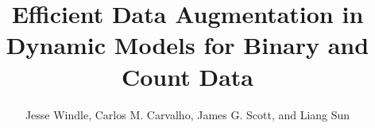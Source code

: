\documentclass[12pt]{article}
\begin{document}
\renewcommand{\thefootnote}{\fnsymbol{footnote}}
\author{
  Jesse Windle\footnotemark[1],
  Carlos M. Carvalho\footnotemark[2],
  James G. Scott\footnotemark[2], and
  Liang Sun\footnotemark[2]%
}

\title{Efficient Data Augmentation in Dynamic Models for Binary and Count Data}

\maketitle

\renewcommand{\thefootnote}{\arabic{footnote}}




{}

\end{document}
